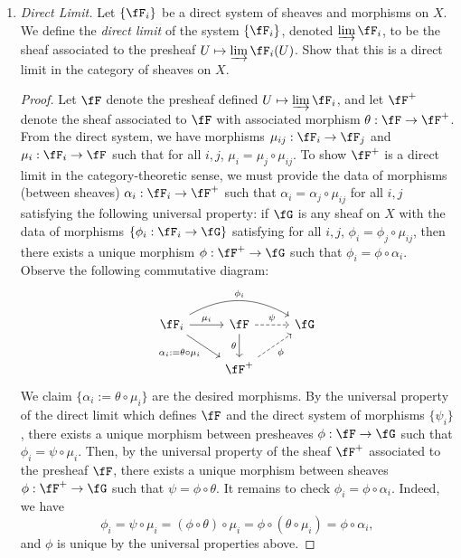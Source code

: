 \documentclass[a4paper]{article}
\begin{document}
\begin{enumerate} [label=\textbf{\arabic*.}, leftmargin=0em]
    \item[\textbf{10.}] \textit{Direct Limit.} Let $\{ \fF_i \}$ be a direct system of sheaves and morphisms on $X$. We define the \textit{direct limit} of the system $\{ \fF_i \}$, denoted $\varinjlim \fF_i$, to be the sheaf associated to the presheaf $U \mapsto \varinjlim \fF_i(U)$. Show that this is a direct limit in the category of sheaves on $X$.

          \begin{proof}
              Let $\fF$ denote the presheaf defined $U \mapsto \varinjlim \fF_i$, and let $\fF^+$ denote the sheaf associated to $\fF$ with associated morphism $\theta : \fF \to \fF^+$. From the direct system, we have morphisms $\mu_{ij} : \fF_i \to \fF_j$ and $\mu_i : \fF_i \to \fF$ such that for all $i, j$, $\mu_{i} = \mu_j \circ \mu_{ij}$. To show $\fF^+$ is a direct limit in the category-theoretic sense, we must provide the data of morphisms (between sheaves) $\alpha_i : \fF_i \to \fF^+$ such that $\alpha_i = \alpha_j \circ \mu_{ij}$ for all $i, j$ satisfying the following universal property: if $\fG$ is any sheaf on $X$ with the data of morphisms $\{ \phi_i : \fF_i \to \fG \}$ satisfying for all $i, j$, $\phi_i = \phi_j \circ \mu_{ij}$, then there exists a unique morphism $\phi : \fF^+ \to \fG$ such that $\phi_i = \phi \circ \alpha_i$. Observe the following commutative diagram:
              \[ \begin{tikzcd}
                      \fF_i \arrow[r, "\mu_i"] \arrow[rr, "\phi_i", bend left] \arrow[rd, "\alpha_i:=\theta\circ \mu_i"'] & \fF \arrow[d, "\theta"'] \arrow[r, "\psi", dashed] & \fG \\
                      & \fF^+ \arrow[ru, "\phi"', dashed]                  &
                  \end{tikzcd} \]
              We claim $\{ \alpha_i := \theta \circ \mu_i \}$ are the desired morphisms. By the universal property of the direct limit which defines $\fF$ and the direct system of morphisms $\{ \psi_i \}$, there exists a unique morphism between presheaves $\phi : \fF \to \fG$ such that $\phi_i = \psi \circ \mu_i$. Then, by the universal property of the sheaf $\fF^+$ associated to the presheaf $\fF$, there exists a unique morphism between sheaves $\phi : \fF^+ \to \fG$ such that $\psi = \phi \circ \theta$. It remains to check $\phi_i = \phi \circ \alpha_i$. Indeed, we have
              \begin{equation*}
                  \phi_i = \psi \circ \mu_i = (\phi \circ \theta) \circ \mu_i = \phi \circ (\theta \circ \mu_i) = \phi \circ \alpha_i,
              \end{equation*}
              and $\phi$ is unique by the universal properties above.
          \end{proof}


\end{enumerate}
\end{document}
